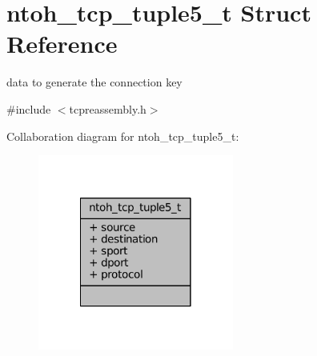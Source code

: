 \hypertarget{structntoh__tcp__tuple5__t}{\section{ntoh\-\_\-tcp\-\_\-tuple5\-\_\-t Struct Reference}
\label{structntoh__tcp__tuple5__t}
}


data to generate the connection key  




{\ttfamily \#include $<$tcpreassembly.\-h$>$}



Collaboration diagram for ntoh\-\_\-tcp\-\_\-tuple5\-\_\-t\-:
\nopagebreak
\begin{figure}[H]
\begin{center}
\leavevmode
\includegraphics[width=182pt]{structntoh__tcp__tuple5__t__coll__graph}
\end{center}
\end{figure}
